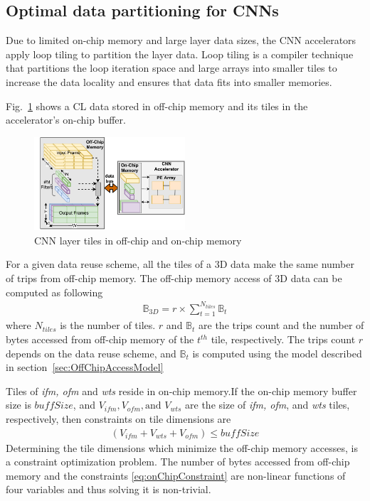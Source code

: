 \documentclass[a4paper,10pt]{article}
\newcommand{\numBytesOffChip}{\mathbb{B}}
\newcommand{\BuffSize}{buffSize}
\begin{document}
\subsection{Optimal data partitioning for CNNs}
Due to limited on-chip memory and large layer data sizes, the CNN accelerators apply loop tiling to partition the layer data. Loop tiling is a compiler  technique~\cite{aho2006compilers} that partitions the loop iteration space and large arrays into smaller tiles to increase the data locality and ensures that data fits into smaller memories. 

Fig.~\ref{fig:partitioningDataUsingTiling} shows a CL data stored in off-chip memory and its tiles in the accelerator's on-chip buffer.
\begin{figure}[!htb]
	\centering
	\includegraphics[width=0.5\textwidth]{images/AboutTheCNNTiles.pdf}
	\caption{CNN layer tiles in off-chip and on-chip memory}
	\label{fig:partitioningDataUsingTiling}
	\vspace{-1.0em}
\end{figure}
For a given data reuse scheme, all the tiles of a 3D data make the same number of trips from off-chip memory. The off-chip memory access of 3D data can be computed as following
\begin{align}\label{eq:BasicOffChip3DDataAccess}
	\numBytesOffChip_{3D}{=}r{\times} \sum_{t=1}^{N_{tiles}}{\numBytesOffChip_{t}}
\end{align}
where $N_{tiles}$ is the number of tiles. $r$ and $\numBytesOffChip_{t}$ are the trips count and the number of bytes accessed from off-chip memory of the $t^{th}$ tile, respectively.  The trips count $r$ depends on the data reuse scheme, and $\numBytesOffChip_{t}$  is computed using the model described in section~\ref{sec:OffChipAccessModel}

Tiles of \textit{ifm, ofm} and \textit{wts} reside in on-chip memory.If the on-chip memory buffer size is $\BuffSize$, and $V_{ifm}, V_{ofm}, \text{and }V_{wts}$ are the size of \textit{ifm, ofm}, and \textit{wts} tiles, respectively, then constraints on tile dimensions are
\begin{align}\label{eq:onChipConstraint}
		(V_{ifm}{+}V_{wts}{+}V_{ofm})\leq \BuffSize 
\end{align}
Determining the tile dimensions which minimize the off-chip memory accesses, is a constraint optimization problem. The  number of bytes accessed from off-chip memory and the constraints \eqref{eq:onChipConstraint} are non-linear functions of four variables and thus solving it is non-trivial.
\end{document}
